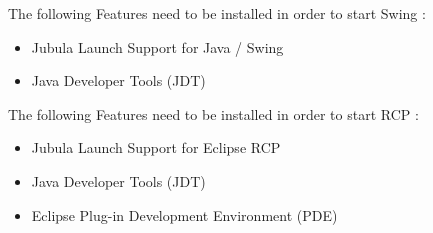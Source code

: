 The following Features need to be installed in order to start Swing \gdauts{}:
\begin{itemize}
\item{Jubula Launch Support for Java / Swing}
\item{Java Developer Tools (JDT)}
\end{itemize}

The following Features need to be installed in order to start RCP \gdauts{}:
\begin{itemize}
\item{Jubula Launch Support for Eclipse RCP}
\item{Java Developer Tools (JDT)}
\item{Eclipse Plug-in Development Environment (PDE)}
\end{itemize}

